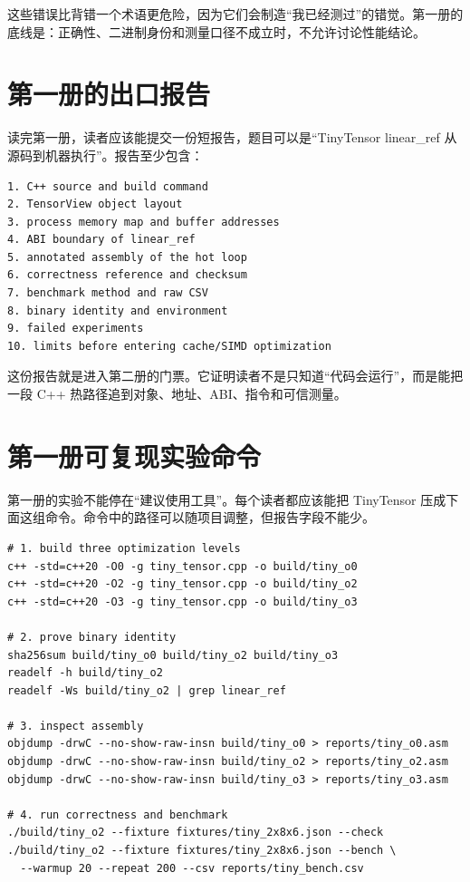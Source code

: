 这些错误比背错一个术语更危险，因为它们会制造“我已经测过”的错觉。第一册的底线是：正确性、二进制身份和测量口径不成立时，不允许讨论性能结论。

\section*{第一册的出口报告}

读完第一册，读者应该能提交一份短报告，题目可以是“TinyTensor linear\_ref 从源码到机器执行”。报告至少包含：

\begin{lstlisting}[numbers=none,caption={第一册出口报告目录}]
1. C++ source and build command
2. TensorView object layout
3. process memory map and buffer addresses
4. ABI boundary of linear_ref
5. annotated assembly of the hot loop
6. correctness reference and checksum
7. benchmark method and raw CSV
8. binary identity and environment
9. failed experiments
10. limits before entering cache/SIMD optimization
\end{lstlisting}

这份报告就是进入第二册的门票。它证明读者不是只知道“代码会运行”，而是能把一段 C++ 热路径追到对象、地址、ABI、指令和可信测量。

\section*{第一册可复现实验命令}

第一册的实验不能停在“建议使用工具”。每个读者都应该能把 TinyTensor 压成下面这组命令。命令中的路径可以随项目调整，但报告字段不能少。

\begin{lstlisting}[numbers=none,caption={TinyTensor 第一册实验命令模板}]
# 1. build three optimization levels
c++ -std=c++20 -O0 -g tiny_tensor.cpp -o build/tiny_o0
c++ -std=c++20 -O2 -g tiny_tensor.cpp -o build/tiny_o2
c++ -std=c++20 -O3 -g tiny_tensor.cpp -o build/tiny_o3

# 2. prove binary identity
sha256sum build/tiny_o0 build/tiny_o2 build/tiny_o3
readelf -h build/tiny_o2
readelf -Ws build/tiny_o2 | grep linear_ref

# 3. inspect assembly
objdump -drwC --no-show-raw-insn build/tiny_o0 > reports/tiny_o0.asm
objdump -drwC --no-show-raw-insn build/tiny_o2 > reports/tiny_o2.asm
objdump -drwC --no-show-raw-insn build/tiny_o3 > reports/tiny_o3.asm

# 4. run correctness and benchmark
./build/tiny_o2 --fixture fixtures/tiny_2x8x6.json --check
./build/tiny_o2 --fixture fixtures/tiny_2x8x6.json --bench \
  --warmup 20 --repeat 200 --csv reports/tiny_bench.csv
\end{lstlisting}

